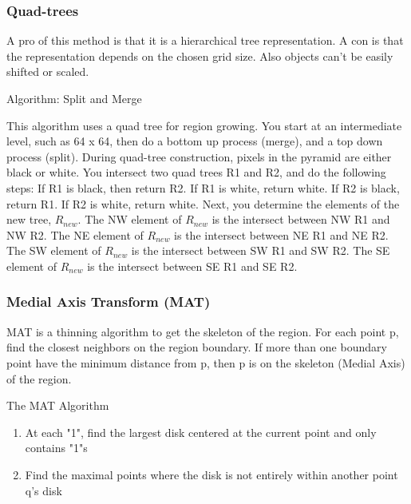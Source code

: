 \documentclass{article}
\begin{document}
\begin{multicols}{2}
 \subsubsection{Quad-trees}

  A pro of this method is that it is a hierarchical tree representation. A con is that the representation depends on the chosen grid size. Also objects can't be easily shifted or scaled.
  
  \vspace{5mm}

  Algorithm: Split and Merge

  \vspace{5mm}

  This algorithm uses a quad tree for region growing. You start at an intermediate level, such as 64 x 64, then do a bottom up process (merge), and a top down process (split).
  During quad-tree construction, pixels in the pyramid are either black or white.
  You intersect two quad trees R1 and R2, and do the following steps:
  If R1 is black, then return R2. If R1 is white, return white. If R2 is black, return R1. If R2 is white, return white.
  Next, you determine the elements of the new tree, $R_{new}$.
  The NW element of $R_{new}$ is the intersect between NW R1 and NW R2.
  The NE element of $R_{new}$ is the intersect between NE R1 and NE R2.
  The SW element of $R_{new}$ is the intersect between SW R1 and SW R2.
  The SE element of $R_{new}$ is the intersect between SE R1 and SE R2.

 \subsubsection{Medial Axis Transform (MAT)}


  MAT is a thinning algorithm to get the skeleton of the region.
  For each point p, find the closest neighbors on the region boundary.
  If more than one boundary point have the minimum distance from p, then p is on the skeleton (Medial Axis) of the region.

  \vspace{5mm}

  The MAT Algorithm
  \begin{enumerate}
    \item {At each "1", find the largest disk centered at the current point and only contains "1"s}
    \item {Find the maximal points where the disk is not entirely within another point q's disk}
  \end{enumerate}


\end{multicols}
\end{document}
